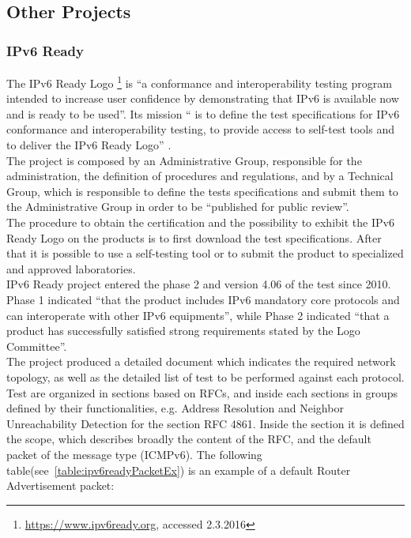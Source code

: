 \documentclass[12pt]{article}
\begin{document}
\subsection{Other Projects}
\label{sub:otherProj}

\subsubsection{IPv6 Ready}
\label{subsub:ipv6Ready}

The IPv6 Ready Logo \footnote{\url{https://www.ipv6ready.org}, accessed 2.3.2016} is ``a conformance and interoperability testing program intended to increase user confidence by demonstrating that IPv6 is available now 
and is ready to be used''. Its mission `` is to define the test specifications for IPv6 conformance and interoperability testing, to provide access to self-test tools and to deliver the IPv6 Ready Logo'' \cite{ipv6ready}.\\
The project is composed by an Administrative Group, responsible for the administration, the definition of procedures and regulations, and by a Technical Group, which is responsible to define the tests specifications and 
submit them to the Administrative Group in order to be ``published for public review''.\\
The procedure to obtain the certification and the possibility to exhibit the IPv6 Ready Logo on the products is to first download the test specifications. After that it is possible to use a self-testing tool or to submit 
the product to specialized and approved laboratories.\\
IPv6 Ready project entered the phase 2 and version 4.06 of the test since 2010. Phase 1 indicated ``that the product includes IPv6 mandatory core protocols and can interoperate with other IPv6 equipments'', while Phase 2 
indicated ``that a product has successfully satisfied strong requirements stated by the Logo Committee''.\\
The project produced a detailed document\cite{ipv6readyCore} which indicates the required network topology, as well as the detailed list of test to be performed against each protocol. Test are organized in sections 
based on RFCs, and inside each sections in groups defined by their functionalities, e.g. Address Resolution and Neighbor Unreachability Detection for the section RFC 4861. Inside the section it is defined the scope, which 
describes broadly the content of the RFC, and the default packet of the message type (ICMPv6). The following table(see~\ref{table:ipv6readyPacketEx}) is an example of a default Router Advertisement packet:
\end{document}
